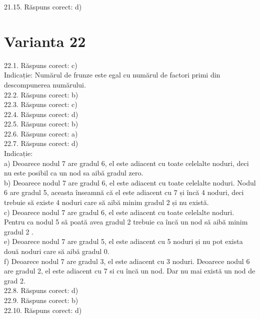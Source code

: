 21.15. Răspuns corect: d)\\

\section*{Varianta 22}

22.1. Răspuns corect: c)\\
Indicație: Numărul de frunze este egal cu numărul de factori primi din descompunerea numărului.\\

22.2. Răspuns corect: b)\\

22.3. Răspuns corect: c)\\

22.4. Răspuns corect: d)\\

22.5. Răspuns corect: b)\\

22.6. Răspuns corect: a)\\

22.7. Răspuns corect: d)\\
Indicație:\\ a) Deoarece nodul 7 are gradul 6, el este adiacent cu toate celelalte noduri, deci nu este posibil ca un nod sa aibă gradul zero.\\ b) Deoarece nodul 7 are gradul 6, el este adiacent cu toate celelalte noduri. Nodul 6 are gradul 5, aceasta înseamnă că el este adiacent cu 7 și încă 4 noduri, deci trebuie să existe 4 noduri care să aibă minim gradul 2 și nu există.\\ c) Deoarece nodul 7 are gradul 6, el este adiacent cu toate celelalte noduri. Pentru ca nodul 5 să poată avea gradul 2 trebuie ca încă un nod să aibă minim gradul 2 .\\ e) Deoarece nodul 7 are gradul 5, el este adiacent cu 5 noduri și nu pot exista două noduri care să aibă gradul 0.\\ f) Deoarece nodul 7 are gradul 3, el este adiacent cu 3 noduri. Deoarece nodul 6 are gradul 2, el este adiacent cu 7 si cu încă un nod. Dar nu mai există un nod de grad 2.\\

22.8. Răspuns corect: d)\\

22.9. Răspuns corect: b)\\

22.10. Răspuns corect: d)\\

